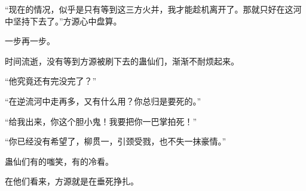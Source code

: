 \begin{this_body}
“现在的情况，似乎是只有等到这三方火并，我才能趁机离开了。那就只好在这河中坚持下去了。”方源心中盘算。

一步再一步。

时间流逝，没有等到方源被刷下去的蛊仙们，渐渐不耐烦起来。

“他究竟还有完没完了？”

“在逆流河中走再多，又有什么用？你总归是要死的。”

“给我出来，你这个胆小鬼！我要把你一巴掌拍死！”

“你已经没有希望了，柳贯一，引颈受戮，也不失一抹豪情。”

蛊仙们有的嗤笑，有的冷看。

在他们看来，方源就是在垂死挣扎。

\end{this_body}

